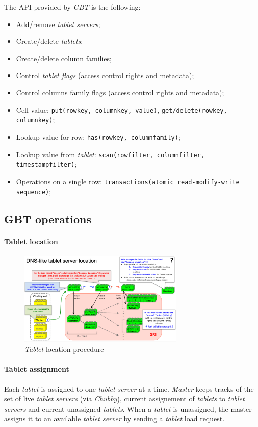 \bigskip\noindent
The API provided by \emph{GBT} is the following:
\begin{itemize}
    \item Add/remove \emph{tablet servers};
    \item Create/delete \emph{tablets};
    \item Create/delete column families;
    \item Control \emph{tablet flags} (access control rights and metadata);
    \item Control columns family flags (access control rights and metadata);
    \item Cell value: \texttt{put(rowkey, columnkey, value)},
    \texttt{get/delete(rowkey, columnkey)};
    \item Lookup value for row: \texttt{has(rowkey, columnfamily)};
    \item Lookup value from \emph{tablet}: \texttt{scan(rowfilter, columnfilter, timestampfilter)};
    \item Operations on a single row: \texttt{transactions(atomic read-modify-write sequence)};
\end{itemize}

\subsection{GBT operations}
\paragraph{Tablet location}\mbox{}

\begin{figure}[h!]
    \centering
    \includegraphics[width=0.7\textwidth]{images/gbt-tablet-location.png}
    \caption{\emph{Tablet} location procedure}
\end{figure}

\paragraph{Tablet assignment}
Each \emph{tablet} is assigned to one \emph{tablet server} at a time.
\emph{Master} keeps tracks of the set of live \emph{tablet servers} (via
\emph{Chubby}), current assignement of \emph{tablets} to \emph{tablet servers}
and current unassigned \emph{tablets}. When a \emph{tablet} is unassigned, the
master assigns it to an available \emph{tablet server} by sending a \emph{tablet}
load request.

